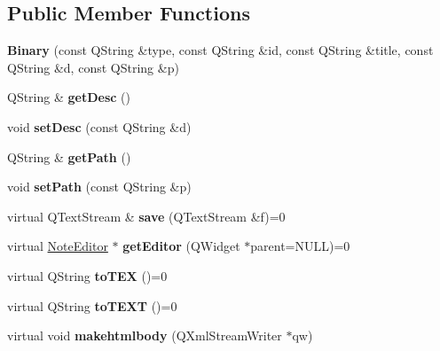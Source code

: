 \subsection*{\-Public \-Member \-Functions}
\begin{DoxyCompactItemize}
\item 
\hypertarget{classBinary_a8f8e5cf0c64bc1c1cc1bc2b9e7e3cfe2}{{\bfseries \-Binary} (const \-Q\-String \&type, const \-Q\-String \&id, const \-Q\-String \&title, const \-Q\-String \&d, const \-Q\-String \&p)}\label{classBinary_a8f8e5cf0c64bc1c1cc1bc2b9e7e3cfe2}

\item 
\hypertarget{classBinary_a1c69ab4bffa479268f5e76a5f9ea2239}{\-Q\-String \& {\bfseries get\-Desc} ()}\label{classBinary_a1c69ab4bffa479268f5e76a5f9ea2239}

\item 
\hypertarget{classBinary_a1cbb14af940b5ae61887dc9931f1c914}{void {\bfseries set\-Desc} (const \-Q\-String \&d)}\label{classBinary_a1cbb14af940b5ae61887dc9931f1c914}

\item 
\hypertarget{classBinary_a2e9e439c4f6dfd9ad8c934ee1770956d}{\-Q\-String \& {\bfseries get\-Path} ()}\label{classBinary_a2e9e439c4f6dfd9ad8c934ee1770956d}

\item 
\hypertarget{classBinary_af564f148d20972efabb9c84357a40b58}{void {\bfseries set\-Path} (const \-Q\-String \&p)}\label{classBinary_af564f148d20972efabb9c84357a40b58}

\item 
\hypertarget{classBinary_a6c4838210e5b73ace50a931b3fddd0b2}{virtual \-Q\-Text\-Stream \& {\bfseries save} (\-Q\-Text\-Stream \&f)=0}\label{classBinary_a6c4838210e5b73ace50a931b3fddd0b2}

\item 
\hypertarget{classBinary_af9d27a0059a8fc7dc20c5497eda548ac}{virtual \hyperlink{classNoteEditor}{\-Note\-Editor} $\ast$ {\bfseries get\-Editor} (\-Q\-Widget $\ast$parent=\-N\-U\-L\-L)=0}\label{classBinary_af9d27a0059a8fc7dc20c5497eda548ac}

\item 
\hypertarget{classBinary_ab2e81910a027eefdbd14c11ea3ef2d31}{virtual \-Q\-String {\bfseries to\-T\-E\-X} ()=0}\label{classBinary_ab2e81910a027eefdbd14c11ea3ef2d31}

\item 
\hypertarget{classBinary_a0571d2774b66b5ccbb60aecfb9b111d1}{virtual \-Q\-String {\bfseries to\-T\-E\-X\-T} ()=0}\label{classBinary_a0571d2774b66b5ccbb60aecfb9b111d1}

\item 
\hypertarget{classBinary_a1d6197854ccf7b1fcdce3a11bc9c1a37}{virtual void {\bfseries makehtmlbody} (\-Q\-Xml\-Stream\-Writer $\ast$qw)}\label{classBinary_a1d6197854ccf7b1fcdce3a11bc9c1a37}

\end{DoxyCompactItemize}
